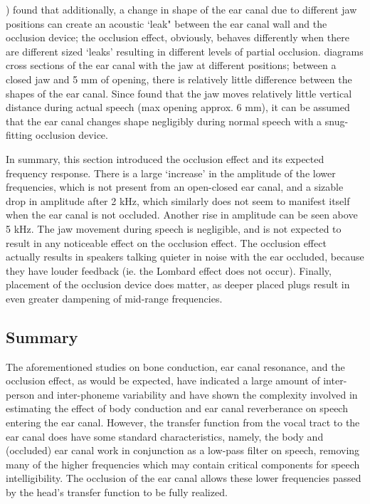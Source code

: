 \cite{hansen:97b}) found that additionally, a change in shape of the ear canal due to different jaw positions can create an acoustic `leak" between the ear canal wall and the occlusion device; the occlusion effect, obviously, behaves differently when there are different sized `leaks' resulting in different levels of partial occlusion. 
\cite{hansen:97b} diagrams cross sections of the ear canal with the jaw at different positions; between a closed jaw and 5 mm of opening, there is relatively little difference between the shapes of the ear canal.  Since \cite{borghese:97} found that the jaw moves relatively little vertical distance during actual speech (max opening approx. 6 mm), it can be assumed that the ear canal changes shape negligibly during normal speech with a snug-fitting occlusion device. 

In summary, %
this section introduced the occlusion effect and its expected frequency response.  There is a large `increase' in the amplitude of the lower frequencies, which is not present from an open-closed ear canal, and a sizable drop in amplitude after 2 kHz, which similarly does not seem to manifest itself when the ear canal is not occluded.  Another rise in amplitude can be seen above 5 kHz.  The jaw movement during speech is negligible, and is not expected to result in any noticeable effect on the occlusion effect.  The occlusion effect actually results in speakers talking quieter in noise with the ear occluded, because they have louder feedback (ie. the Lombard effect does not occur).  Finally, placement of the occlusion device does matter, as deeper placed plugs result in even greater dampening of mid-range frequencies.


\subsection{Summary}

The aforementioned studies on bone conduction, ear canal resonance, and the occlusion effect, as would be expected, have indicated a large amount of inter-person and inter-phoneme variability and have shown the complexity involved in estimating the effect of body conduction and ear canal reverberance on speech entering the ear canal.  However, the transfer function from the vocal tract to the ear canal does have some standard characteristics, namely, the body and (occluded) ear canal work in conjunction as a low-pass filter on speech, removing many of the higher frequencies which may contain critical components for speech intelligibility.  The occlusion of the ear canal allows these lower frequencies passed by the head's transfer function to be fully realized.

